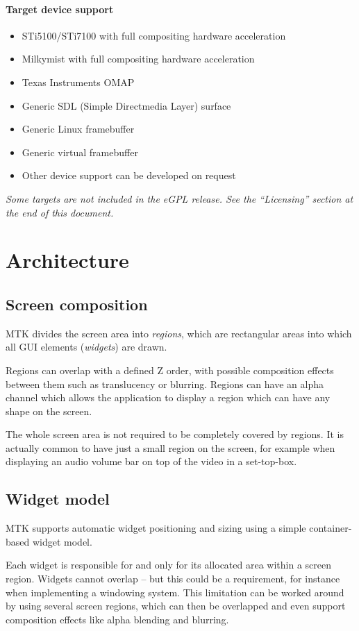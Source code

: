 \documentclass[a4paper,11pt]{journal}
\begin{document}
\paragraph{Target device support}
\begin{itemize}[noitemsep,topsep=0mm]
\item STi5100/STi7100 with full compositing hardware acceleration
\item Milkymist with full compositing hardware acceleration
\item Texas Instruments OMAP
\item Generic SDL (Simple Directmedia Layer) surface
\item Generic Linux framebuffer
\item Generic virtual framebuffer
\item Other device support can be developed on request
\end{itemize}
\hbox{}
\textit{Some targets are not included in the eGPL release. See the ``Licensing'' section at the end of this document.}

\section{Architecture}
\subsection{Screen composition}
MTK divides the screen area into \textit{regions}, which are rectangular areas into which all GUI elements (\textit{widgets}) are drawn.

Regions can overlap with a defined Z order, with possible composition effects between them such as translucency or blurring. Regions can have an alpha channel which allows the application to display a region which can have any shape on the screen.

The whole screen area is not required to be completely covered by regions. It is actually common to have just a small region on the screen, for example when displaying an audio volume bar on top of the video in a set-top-box.

\subsection{Widget model}
MTK supports automatic widget positioning and sizing using a simple container-based widget model.

Each widget is responsible for and only for its allocated area within a screen region. Widgets cannot overlap -- but this could be a requirement, for instance when implementing a windowing system. This limitation can be worked around by using several screen regions, which can then be overlapped and even support composition effects like alpha blending and blurring.
\end{document}
